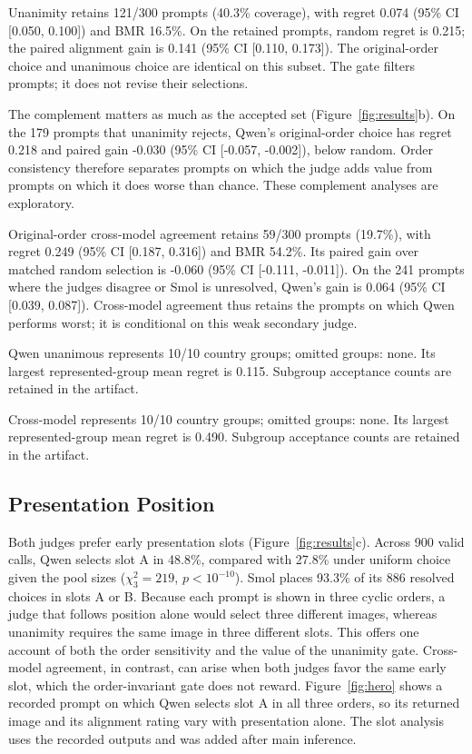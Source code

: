 Unanimity retains 121/300 prompts (40.3\% coverage), with regret 0.074 (95\% CI [0.050, 0.100]) and BMR 16.5\%. On the retained prompts, random regret is 0.215; the paired alignment gain is 0.141 (95\% CI [0.110, 0.173]). The original-order choice and unanimous choice are identical on this subset. The gate filters prompts; it does not revise their selections.

The complement matters as much as the accepted set (Figure~\ref{fig:results}b). On the 179 prompts that unanimity rejects, Qwen's original-order choice has regret 0.218 and paired gain -0.030 (95\% CI [-0.057, -0.002]), below random. Order consistency therefore separates prompts on which the judge adds value from prompts on which it does worse than chance. These complement analyses are exploratory.

Original-order cross-model agreement retains 59/300 prompts (19.7\%), with regret 0.249 (95\% CI [0.187, 0.316]) and BMR 54.2\%. Its paired gain over matched random selection is -0.060 (95\% CI [-0.111, -0.011]). On the 241 prompts where the judges disagree or Smol is unresolved, Qwen's gain is 0.064 (95\% CI [0.039, 0.087]). Cross-model agreement thus retains the prompts on which Qwen performs worst; it is conditional on this weak secondary judge.

Qwen unanimous represents 10/10 country groups; omitted groups: none. Its largest represented-group mean regret is 0.115. Subgroup acceptance counts are retained in the artifact.

Cross-model represents 10/10 country groups; omitted groups: none. Its largest represented-group mean regret is 0.490. Subgroup acceptance counts are retained in the artifact.

\subsection{Presentation Position}

Both judges prefer early presentation slots (Figure~\ref{fig:results}c). Across 900 valid calls, Qwen selects slot A in 48.8\%, compared with 27.8\% under uniform choice given the pool sizes ($\chi^2_{3}=219$, $p<10^{-10}$). Smol places 93.3\% of its 886 resolved choices in slots A or B. Because each prompt is shown in three cyclic orders, a judge that follows position alone would select three different images, whereas unanimity requires the same image in three different slots. This offers one account of both the order sensitivity and the value of the unanimity gate. Cross-model agreement, in contrast, can arise when both judges favor the same early slot, which the order-invariant gate does not reward. Figure~\ref{fig:hero} shows a recorded prompt on which Qwen selects slot A in all three orders, so its returned image and its alignment rating vary with presentation alone. The slot analysis uses the recorded outputs and was added after main inference.

